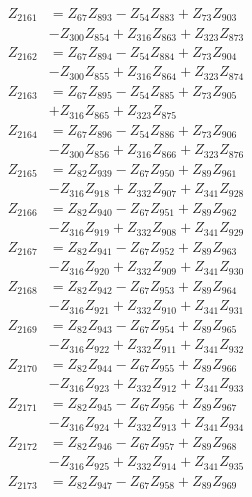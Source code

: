 \begin{multicols}{2}
\begin{align}
Z_{2161} &= Z_{67}Z_{893} - Z_{54}Z_{883} + Z_{73}Z_{903}  \nonumber \\
&- Z_{300}Z_{854} + Z_{316}Z_{863} + Z_{323}Z_{873} \nonumber \\
Z_{2162} &= Z_{67}Z_{894} - Z_{54}Z_{884} + Z_{73}Z_{904}  \nonumber \\
&- Z_{300}Z_{855} + Z_{316}Z_{864} + Z_{323}Z_{874} \nonumber \\
Z_{2163} &= Z_{67}Z_{895} - Z_{54}Z_{885} + Z_{73}Z_{905}  \nonumber \\
&+ Z_{316}Z_{865} + Z_{323}Z_{875} \nonumber \\
Z_{2164} &= Z_{67}Z_{896} - Z_{54}Z_{886} + Z_{73}Z_{906}  \nonumber \\
&- Z_{300}Z_{856} + Z_{316}Z_{866} + Z_{323}Z_{876} \nonumber \\
Z_{2165} &= Z_{82}Z_{939} - Z_{67}Z_{950} + Z_{89}Z_{961}  \nonumber \\
&- Z_{316}Z_{918} + Z_{332}Z_{907} + Z_{341}Z_{928} \nonumber \\
Z_{2166} &= Z_{82}Z_{940} - Z_{67}Z_{951} + Z_{89}Z_{962}  \nonumber \\
&- Z_{316}Z_{919} + Z_{332}Z_{908} + Z_{341}Z_{929} \nonumber \\
Z_{2167} &= Z_{82}Z_{941} - Z_{67}Z_{952} + Z_{89}Z_{963}  \nonumber \\
&- Z_{316}Z_{920} + Z_{332}Z_{909} + Z_{341}Z_{930} \nonumber \\
Z_{2168} &= Z_{82}Z_{942} - Z_{67}Z_{953} + Z_{89}Z_{964}  \nonumber \\
&- Z_{316}Z_{921} + Z_{332}Z_{910} + Z_{341}Z_{931} \nonumber \\
Z_{2169} &= Z_{82}Z_{943} - Z_{67}Z_{954} + Z_{89}Z_{965}  \nonumber \\
&- Z_{316}Z_{922} + Z_{332}Z_{911} + Z_{341}Z_{932} \nonumber \\
Z_{2170} &= Z_{82}Z_{944} - Z_{67}Z_{955} + Z_{89}Z_{966}  \nonumber \\
&- Z_{316}Z_{923} + Z_{332}Z_{912} + Z_{341}Z_{933} \nonumber \\
Z_{2171} &= Z_{82}Z_{945} - Z_{67}Z_{956} + Z_{89}Z_{967}  \nonumber \\
&- Z_{316}Z_{924} + Z_{332}Z_{913} + Z_{341}Z_{934} \nonumber \\
Z_{2172} &= Z_{82}Z_{946} - Z_{67}Z_{957} + Z_{89}Z_{968}  \nonumber \\
&- Z_{316}Z_{925} + Z_{332}Z_{914} + Z_{341}Z_{935} \nonumber \\
Z_{2173} &= Z_{82}Z_{947} - Z_{67}Z_{958} + Z_{89}Z_{969}  \nonumber \\

\end{align}
\end{multicols}

